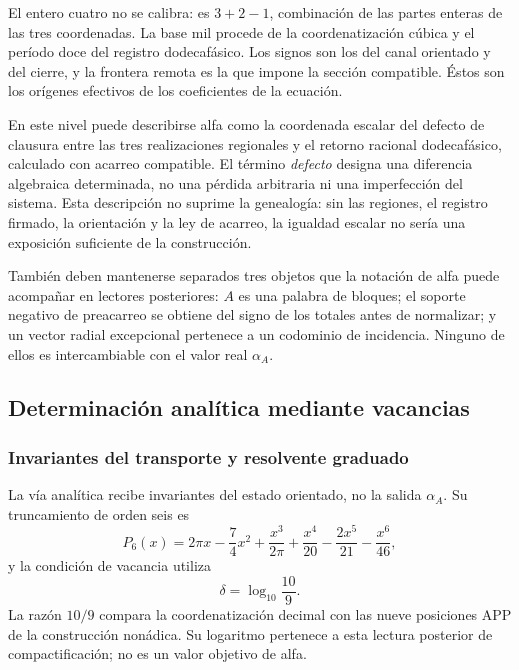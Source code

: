 El entero cuatro no se calibra: es
\(3+2-1\), combinación de las partes enteras de las tres coordenadas.
La base mil procede de la coordenatización cúbica y el período doce del registro dodecafásico. Los
signos son los del canal orientado y del cierre, y la frontera remota es
la que impone la sección compatible. Éstos son los orígenes efectivos de
los coeficientes de la ecuación.

En este nivel puede describirse alfa como la coordenada escalar del
defecto de clausura entre las tres realizaciones regionales y el retorno
racional dodecafásico, calculado con acarreo compatible. El término
\emph{defecto} designa una diferencia algebraica determinada, no una
pérdida arbitraria ni una imperfección del sistema. Esta descripción no
suprime la genealogía: sin las regiones, el registro firmado, la
orientación y la ley de acarreo, la igualdad escalar no sería una
exposición suficiente de la construcción.

También deben mantenerse separados tres objetos que la notación de alfa
puede acompañar en lectores posteriores: \(A\) es una palabra de
bloques; el soporte negativo de preacarreo se obtiene del signo de los
totales antes de normalizar; y un vector radial excepcional pertenece a
un codominio de incidencia. Ninguno de ellos es intercambiable con el
valor real \(\alpha_A\).






\subsection{Determinación analítica mediante vacancias}
\subsubsection{Invariantes del transporte y resolvente graduado}
\label{subsec:alpha-via-b}

La vía analítica recibe invariantes del estado orientado, no la salida
\(\alpha_A\). Su truncamiento de orden seis es
\begin{equation}
 P_6(x)=2\pi x-\frac74x^2
 +\frac{x^3}{2\pi}
 +\frac{x^4}{20}-\frac{2x^5}{21}-\frac{x^6}{46},
 \label{eq:alpha-p6}
\end{equation}
y la condición de vacancia utiliza
\[
 \delta=\log_{10}\frac{10}{9}.
\]
La razón \(10/9\) compara la coordenatización decimal con las nueve posiciones
APP de la construcción nonádica. Su logaritmo pertenece a esta lectura
posterior de compactificación; no es un valor objetivo de alfa.

